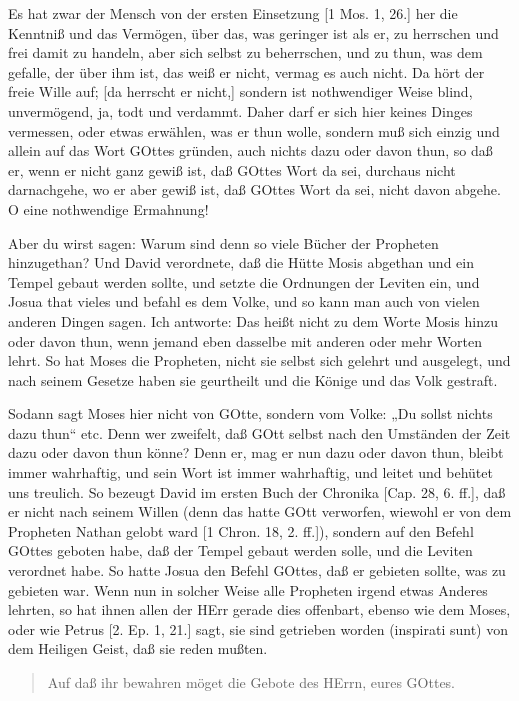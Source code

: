 Es hat zwar der Mensch von der ersten Einsetzung [1 Mos. 1, 26.] her die Kenntniß und das Vermögen, über das, was geringer ist als er, zu herrschen und frei damit zu handeln, aber sich selbst zu beherrschen, und zu thun, was dem gefalle, der über ihm ist, das weiß er nicht, vermag es auch nicht. Da hört der freie Wille auf; [da herrscht er nicht,] sondern ist nothwendiger Weise blind, unvermögend, ja, todt und verdammt. Daher darf er sich hier keines Dinges vermessen, oder etwas erwählen, was er thun wolle, sondern muß sich einzig und allein auf das Wort GOttes gründen, auch nichts dazu oder davon thun, so daß er, wenn er nicht ganz gewiß ist, daß GOttes Wort da sei, durchaus nicht darnachgehe, wo er aber gewiß ist, daß GOttes Wort da sei, nicht davon abgehe. O eine nothwendige Ermahnung!

Aber du wirst sagen: Warum sind denn so
viele Bücher der Propheten hinzugethan? Und David verordnete, daß die Hütte Mosis abgethan und ein Tempel gebaut werden sollte, und setzte die Ordnungen der Leviten ein, und Josua that vieles und befahl es dem Volke, und so kann man auch von vielen anderen Dingen sagen. Ich antworte: Das heißt nicht zu dem Worte Mosis hinzu oder davon thun, wenn jemand eben dasselbe mit anderen oder mehr Worten lehrt. So hat Moses die Propheten, nicht sie selbst sich gelehrt und ausgelegt, und nach seinem Gesetze haben sie geurtheilt und die Könige und das Volk gestraft.

Sodann sagt Moses hier nicht von GOtte, sondern vom Volke: „Du sollst nichts dazu thun“ etc. Denn wer zweifelt, daß GOtt selbst nach den Umständen der Zeit dazu oder davon thun könne? Denn er, mag er nun dazu oder davon thun, bleibt immer wahrhaftig, und sein Wort ist immer wahrhaftig, und leitet und behütet uns treulich. So bezeugt David im ersten Buch der Chronika [Cap. 28, 6. ff.], daß er nicht nach seinem Willen (denn das hatte GOtt verworfen, wiewohl er von dem Propheten Nathan gelobt ward [1 Chron. 18, 2. ff.]), sondern auf den Befehl GOttes geboten habe, daß der Tempel gebaut werden solle, und die Leviten verordnet habe. So hatte Josua den Befehl GOttes, daß er gebieten sollte, was zu gebieten war. Wenn nun in solcher Weise alle Propheten irgend etwas Anderes lehrten, so hat ihnen allen der HErr gerade dies offenbart, ebenso wie dem Moses, oder wie Petrus [2. Ep. 1, 21.] sagt, sie sind getrieben worden (inspirati sunt) von dem Heiligen Geist, daß sie reden mußten.

\begin{quote}
Auf daß ihr bewahren möget die Gebote des HErrn, eures GOttes.
\end{quote}

